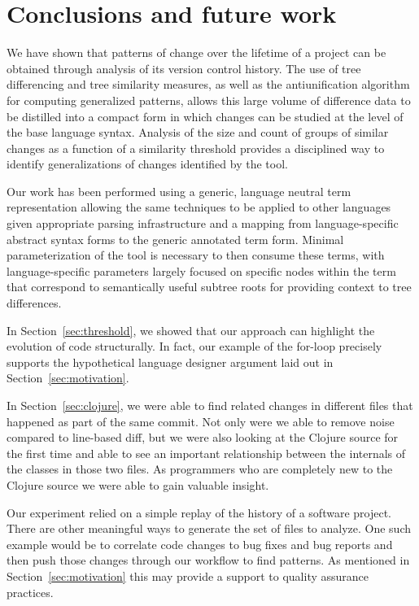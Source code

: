 \section{Conclusions and future work}

We have shown that patterns of change over the lifetime of a project can be
obtained through analysis of its version control history.  The use of tree
differencing and tree similarity measures, as well as the antiunification
algorithm for computing generalized patterns, allows this large volume of
difference data to be distilled into a compact form in which changes can be
studied at the level of the base language syntax.  Analysis of the size and
count of groups of similar changes as a function of a similarity threshold
provides a disciplined way to identify generalizations of changes identified by
the tool.

Our work has been performed using a generic, language neutral term
representation allowing the same techniques to be applied to other languages
given appropriate parsing infrastructure and a mapping from language-specific
abstract syntax forms to the generic annotated term form.  Minimal
parameterization of the tool is necessary to then consume these terms, with
language-specific parameters largely focused on specific nodes within the term
that correspond to semantically useful subtree roots for providing context to
tree differences.

In Section~\ref{sec:threshold}, we showed that our approach can highlight the
evolution of code structurally. In fact, our example of the for-loop precisely
supports the hypothetical language designer argument laid out in
Section~\ref{sec:motivation}.

In Section~\ref{sec:clojure}, we were able to find related changes in different
files that happened as part of the same commit. Not only were we able to remove
noise compared to line-based diff, but we were also looking at the Clojure
source for the first time and able to see an important relationship between the
internals of the classes in those two files. As programmers who are completely
new to the Clojure source we were able to gain valuable insight.


Our experiment relied on a simple replay of the history of a software project.
There are other meaningful ways to generate the set of files to analyze. One
such example would be to correlate code changes to bug fixes and bug reports
and then push those changes through our workflow to find patterns.  As
mentioned in Section~\ref{sec:motivation} this may provide a support to quality
assurance practices.

